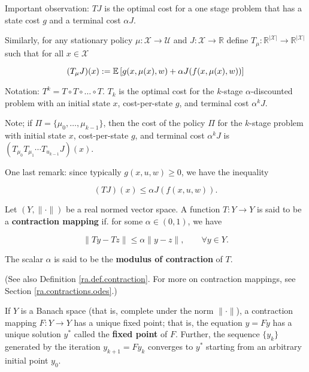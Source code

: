 Important observation: \(TJ\) is the optimal cost for a one stage problem that has a state cost \(g\) and a terminal cost \(\alpha J\).

Similarly, for any stationary policy \(\mu: \mathcal{X} \to \mathcal{U}\) and \(J: \mathcal{X} \to \mathbb{R}\) define \(T_\mu: \mathbb{R}^{|\mathcal{X}|} \to \mathbb{R}^{|\mathcal{X}|}\) such that for all \(x \in \mathcal{X}\)

\[
(T_\mu J)(x) := \mathbb{E} \left[ g(x,\mu(x) ,w) + \alpha J(f(x,\mu(x),w)) \right] 
\]

Notation: \(T^k = T \circ T \circ \ldots \circ T\). \(T_k\) is the optimal cost for the \(k\)-stage \(\alpha\)-discounted problem with an initial state \(x\), cost-per-state \(g\), and terminal cost \(\alpha^k J\).

Note; if \(\Pi = \{\mu_0, \ldots, \mu_{k-1}\}\), then the cost of the policy \(\Pi\) for the \(k\)-stage problem with initial state \(x\), cost-per-state \(g\), and terminal cost \(\alpha^k J\) is \((T_{\mu_0} T_{\mu_1} \cdots T_{u_{k-1}} J)(x)\). 

One last remark: since typically \(g(x,u,w) \geq 0\), we have the inequality

\begin{equation}\label{stoch.dp.operator.ineq}
(TJ)(x) \leq \alpha J(f(x,u,w)) .
\end{equation}

\begin{definition}\label{statlearning.def.contraction}

Let \((Y, \lVert \cdot \rVert)\) be a real normed vector space. A function \(T: Y \to Y\) is said to be a \textbf{contraction mapping} if. for some \(\alpha \in (0,1)\), we have

\[
\lVert Ty - Tz \rVert \leq \alpha \lVert y - z \rVert, \qquad \forall y \in Y.
\]

The scalar \(\alpha\) is said to be the \textbf{modulus of contraction} of \(T\).

(See also Definition \ref{ra.def.contraction}. For more on contraction mappings, see Section \ref{ra.contractions.odes}.)

\end{definition}




If \(Y\) is a Banach space (that is, complete under the norm \(\lVert \cdot \rVert\)), a contraction mapping \(F: Y \to Y\) has a unique fixed point; that is, the equation \(y = Fy\) has a unique solution \(y^*\) called the \textbf{fixed point} of \(F\). Further, the sequence \(\{y_k\}\) generated by the iteration \(y_{k+1} = F y_k\) converges to \(y^*\) starting from an arbitrary initial point \(y_0\).

